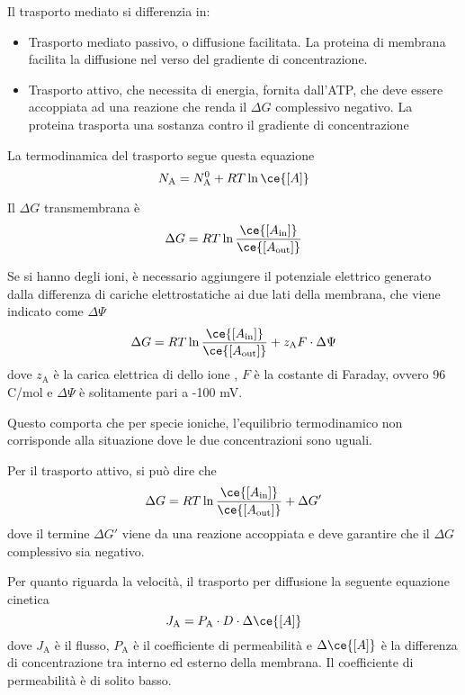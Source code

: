Il trasporto mediato si differenzia in:
\begin{itemize}
\item Trasporto mediato passivo, o diffusione facilitata. La proteina di membrana facilita la diffusione nel verso del gradiente di concentrazione.
\item Trasporto attivo, che necessita di energia, fornita dall'ATP, che deve essere accoppiata ad una reazione che renda il $\Delta G$ complessivo negativo. La proteina trasporta una sostanza contro il gradiente di concentrazione
\end{itemize}


La termodinamica del trasporto segue questa equazione
\[
N_{\text{A}} = N_{\text{A}}^0 + RT \ln \ce{[A]}
\]

Il $\Delta G$ transmembrana è
\[
\Delta G = RT \ln \frac{\ce{[A_{\text{in}}]}}{\ce{[A_{\text{out}}]}}
\]

Se si hanno degli ioni, è necessario aggiungere il potenziale elettrico generato dalla differenza di cariche elettrostatiche ai due lati della membrana, che viene indicato come $\Delta \Psi$
\[
\Delta G = RT \ln \frac{\ce{[A_{\text{in}}]}}{\ce{[A_{\text{out}}]}} + z_{\text{A}} F \cdot \Delta \Psi
\]
dove $z_{\text{A}}$ è la carica elettrica di dello ione , $F$ è la costante di Faraday, ovvero 96 C/mol e $\Delta \Psi$ è solitamente pari a -100 mV.

Questo comporta che per specie ioniche, l'equilibrio termodinamico non corrisponde alla situazione dove le due concentrazioni sono uguali.

Per il trasporto attivo, si può dire che
\[
\Delta G = RT \ln \frac{\ce{[A_{\text{in}}]}}{\ce{[A_{\text{out}}]}} + \Delta G'
\]
dove il termine $\Delta G'$ viene da una reazione accoppiata e deve garantire che il $\Delta G$ complessivo sia negativo.

Per quanto riguarda la velocità, il trasporto per diffusione la seguente equazione cinetica
\[
J_{\text{A}} = P_{\text{A}} \cdot D \cdot \Delta \ce{[A]}
\]
dove $J_{\text{A}}$ è il flusso, $P_{\text{A}}$ è il coefficiente di permeabilità e $\Delta \ce{[A]}$ è la differenza di concentrazione tra interno ed esterno della membrana. Il coefficiente di permeabilità è di solito basso.



